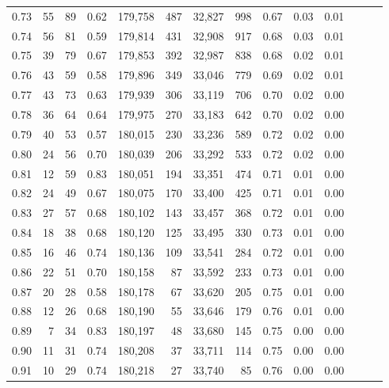 \begin{tabular}{rrrrrrrrrrrrrr}
0.73 &      55 &   89 &  0.62 &  179,758 &      487 &  32,827 &     998 &  0.67 &  0.03 &      0.01 \\
0.74 &      56 &   81 &  0.59 &  179,814 &      431 &  32,908 &     917 &  0.68 &  0.03 &      0.01 \\
0.75 &      39 &   79 &  0.67 &  179,853 &      392 &  32,987 &     838 &  0.68 &  0.02 &      0.01 \\
0.76 &      43 &   59 &  0.58 &  179,896 &      349 &  33,046 &     779 &  0.69 &  0.02 &      0.01 \\
0.77 &      43 &   73 &  0.63 &  179,939 &      306 &  33,119 &     706 &  0.70 &  0.02 &      0.00 \\
0.78 &      36 &   64 &  0.64 &  179,975 &      270 &  33,183 &     642 &  0.70 &  0.02 &      0.00 \\
0.79 &      40 &   53 &  0.57 &  180,015 &      230 &  33,236 &     589 &  0.72 &  0.02 &      0.00 \\
0.80 &      24 &   56 &  0.70 &  180,039 &      206 &  33,292 &     533 &  0.72 &  0.02 &      0.00 \\
0.81 &      12 &   59 &  0.83 &  180,051 &      194 &  33,351 &     474 &  0.71 &  0.01 &      0.00 \\
0.82 &      24 &   49 &  0.67 &  180,075 &      170 &  33,400 &     425 &  0.71 &  0.01 &      0.00 \\
0.83 &      27 &   57 &  0.68 &  180,102 &      143 &  33,457 &     368 &  0.72 &  0.01 &      0.00 \\
0.84 &      18 &   38 &  0.68 &  180,120 &      125 &  33,495 &     330 &  0.73 &  0.01 &      0.00 \\
0.85 &      16 &   46 &  0.74 &  180,136 &      109 &  33,541 &     284 &  0.72 &  0.01 &      0.00 \\
0.86 &      22 &   51 &  0.70 &  180,158 &       87 &  33,592 &     233 &  0.73 &  0.01 &      0.00 \\
0.87 &      20 &   28 &  0.58 &  180,178 &       67 &  33,620 &     205 &  0.75 &  0.01 &      0.00 \\
0.88 &      12 &   26 &  0.68 &  180,190 &       55 &  33,646 &     179 &  0.76 &  0.01 &      0.00 \\
0.89 &       7 &   34 &  0.83 &  180,197 &       48 &  33,680 &     145 &  0.75 &  0.00 &      0.00 \\
0.90 &      11 &   31 &  0.74 &  180,208 &       37 &  33,711 &     114 &  0.75 &  0.00 &      0.00 \\
0.91 &      10 &   29 &  0.74 &  180,218 &       27 &  33,740 &      85 &  0.76 &  0.00 &      0.00 \\

\end{tabular}

